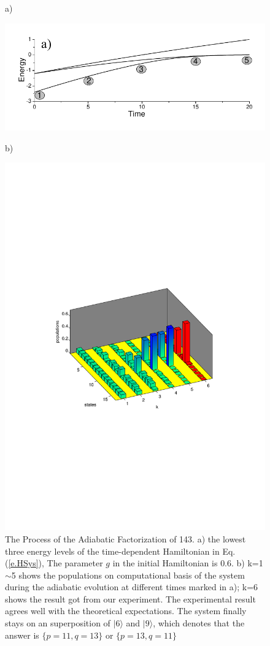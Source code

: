 \documentclass[twocolumn,showpacs,twoside,10pt,prl]{revtex4}
\begin{document}
\begin{figure}[htb]
\begin{center}
a)

\includegraphics[width= 0.75\columnwidth]{spec}


b)

\includegraphics[width= 0.75\columnwidth]{bar}
\end{center}
\caption{The Process of the Adiabatic Factorization of 143. a) the
lowest three energy levels of the time-dependent Hamiltonian in
Eq.(\ref{e.HSys}), The parameter $g$ in the initial Hamiltonian is
$0.6$. b) k=1$\sim$5 shows the populations on computational basis of
the system during the adiabatic evolution at different times marked
in a); k=6 shows the result got from our experiment. The
experimental result agrees well with the theoretical expectations.
The system finally stays on an superposition of $|6\rangle$ and
$|9\rangle$, which denotes that the answer is $\{p=11,q=13\}$ or
$\{p=13,q=11\}$}\label{sim}
\end{figure}
\end{document}
